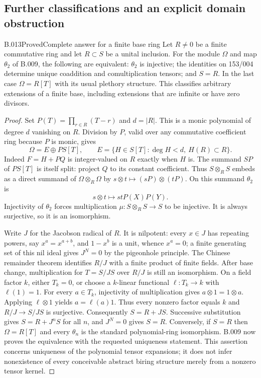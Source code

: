 \subsection{Further classifications and an explicit domain obstruction}
\begin{saresult}{B.013}{Proved}{Complete answer for a finite base ring}
Let $R\ne0$ be a finite commutative ring and let $R\subset S$ be a
unital inclusion. For the module $\Omega$ and map $\theta_2$ of B.009,
the following are equivalent: $\theta_2$ is injective; the identities
on 153/004 determine unique coaddition and comultiplication tensors;
and $S=R$. In the last case $\Omega=R[T]$ with its usual plethory
structure. This classifies arbitrary extensions of a finite base,
including extensions that are infinite or have zero divisors.
\end{saresult}
\begin{proof}
Set $P(T)=\prod_{r\in R}(T-r)$ and $d=|R|$. This is a monic
polynomial of degree $d$ vanishing on $R$. Division by $P$, valid over
any commutative coefficient ring because $P$ is monic, gives
\[
 \Omega=E\oplus P S[T],\qquad
 E=\{H\in S[T]:\deg H<d,\ H(R)\subset R\}.
\]
Indeed $F=H+PQ$ is integer-valued on $R$ exactly when $H$ is.
The summand $SP$ of $PS[T]$ is itself split: project $Q$ to its
constant coefficient. Thus $S\otimes_R S$ embeds as a direct summand
of $\Omega\otimes_R\Omega$ by $s\otimes t\mapsto(sP)\otimes(tP)$.
On this summand $\theta_2$ is
\[
 s\otimes t\longmapsto stP(X)P(Y).
\]
Injectivity of $\theta_2$ forces multiplication
$\mu:S\otimes_R S\to S$ to be injective. It is always surjective,
so it is an isomorphism.

Write $J$ for the Jacobson radical of $R$. It is nilpotent: every
$x\in J$ has repeating powers, say $x^a=x^{a+b}$, and $1-x^b$ is a
unit, whence $x^a=0$; a finite generating set of this nil ideal gives
$J^N=0$ by the pigeonhole principle. The Chinese remainder theorem
identifies $R/J$ with a finite product of finite fields. After base
change, multiplication for $T=S/JS$ over $R/J$ is still an
isomorphism. On a field factor $k$, either $T_k=0$, or choose a
$k$-linear functional $\ell:T_k\to k$ with $\ell(1)=1$.
For every $a\in T_k$, injectivity of multiplication gives
$a\otimes1=1\otimes a$. Applying $\ell\otimes1$ yields
$a=\ell(a)1$. Thus every nonzero factor equals $k$ and
$R/J\to S/JS$ is surjective. Consequently $S=R+JS$.
Successive substitution gives $S=R+J^nS$ for all $n$, and $J^N=0$
gives $S=R$. Conversely, if $S=R$ then $\Omega=R[T]$ and every
$\theta_n$ is the standard polynomial-ring isomorphism. B.009 now
proves the equivalence with the requested uniqueness statement.
This assertion concerns uniqueness of the polynomial tensor
expansions; it does not infer nonexistence of every conceivable
abstract biring structure merely from a nonzero tensor kernel.
\end{proof}

